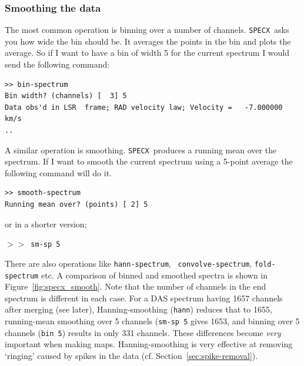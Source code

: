 \documentclass[11pt,twoside]{article}
\newcommand{\SPECX}{{\tt SPECX}}
\newcommand{\SP}{{$>\!>$}}
\begin{document}
\subsubsection{Smoothing the data}
\label{sec:specx_binning}
The most common operation is binning over a number of channels.
\SPECX\ asks you how wide the bin should be. It averages the points in
the bin and plots the average.  So if I want to have a bin of width 5 for
the current spectrum I would send the following command:

\begin{verbatim}
>> bin-spectrum
Bin width? (channels) [  3] 5
Data obs'd in LSR  frame; RAD velocity law; Velocity =   -7.000000     km/s
..
\end{verbatim}

A similar operation is smoothing.  \SPECX\ produces a running mean
over the spectrum.  If I want to smooth the current spectrum using a
5-point average the following command will do it.

\begin{verbatim}
>> smooth-spectrum
Running mean over? (points) [ 2] 5
\end{verbatim}

or in a shorter version;

\SP\ \verb|sm-sp 5 |

There are also operations like {\tt hann-spectrum}, {\tt
convolve-spectrum}, {\tt fold-spectrum} etc. A comparison of binned
and smoothed spectra is shown in Figure~\ref{fig:specx_smooth}. Note
that the number of channels in the end spectrum is different in each
case. For a DAS spectrum having 1657 channels after merging (see
later), Hanning-smoothing ({\tt{hann}}) reduces that to 1655,
running-mean smoothing over 5 channels ({\tt{sm-sp 5}} gives 1653, and
binning over 5 channels ({\tt{bin 5}}) results in only 331
channels. These differences become {\it very} important when making
maps. Hanning-smoothing is very effective at removing `ringing' caused
by spikes in the data (cf. Section~\ref{sec:spike-removal}).
\end{document}
